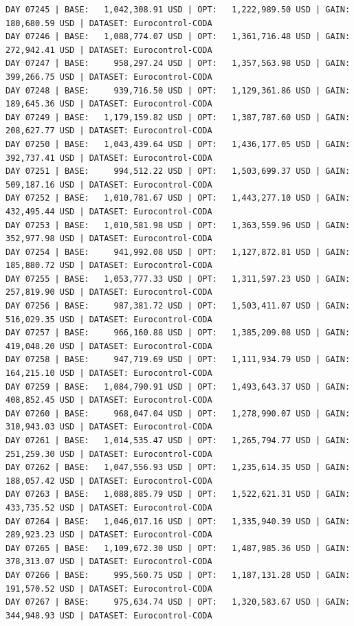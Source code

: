 \documentclass[11pt,a4paper]{article}
\begin{document}
\begin{verbatim}
DAY 07245 | BASE:   1,042,308.91 USD | OPT:   1,222,989.50 USD | GAIN: 180,680.59 USD | DATASET: Eurocontrol-CODA
DAY 07246 | BASE:   1,088,774.07 USD | OPT:   1,361,716.48 USD | GAIN: 272,942.41 USD | DATASET: Eurocontrol-CODA
DAY 07247 | BASE:     958,297.24 USD | OPT:   1,357,563.98 USD | GAIN: 399,266.75 USD | DATASET: Eurocontrol-CODA
DAY 07248 | BASE:     939,716.50 USD | OPT:   1,129,361.86 USD | GAIN: 189,645.36 USD | DATASET: Eurocontrol-CODA
DAY 07249 | BASE:   1,179,159.82 USD | OPT:   1,387,787.60 USD | GAIN: 208,627.77 USD | DATASET: Eurocontrol-CODA
DAY 07250 | BASE:   1,043,439.64 USD | OPT:   1,436,177.05 USD | GAIN: 392,737.41 USD | DATASET: Eurocontrol-CODA
DAY 07251 | BASE:     994,512.22 USD | OPT:   1,503,699.37 USD | GAIN: 509,187.16 USD | DATASET: Eurocontrol-CODA
DAY 07252 | BASE:   1,010,781.67 USD | OPT:   1,443,277.10 USD | GAIN: 432,495.44 USD | DATASET: Eurocontrol-CODA
DAY 07253 | BASE:   1,010,581.98 USD | OPT:   1,363,559.96 USD | GAIN: 352,977.98 USD | DATASET: Eurocontrol-CODA
DAY 07254 | BASE:     941,992.08 USD | OPT:   1,127,872.81 USD | GAIN: 185,880.72 USD | DATASET: Eurocontrol-CODA
DAY 07255 | BASE:   1,053,777.33 USD | OPT:   1,311,597.23 USD | GAIN: 257,819.90 USD | DATASET: Eurocontrol-CODA
DAY 07256 | BASE:     987,381.72 USD | OPT:   1,503,411.07 USD | GAIN: 516,029.35 USD | DATASET: Eurocontrol-CODA
DAY 07257 | BASE:     966,160.88 USD | OPT:   1,385,209.08 USD | GAIN: 419,048.20 USD | DATASET: Eurocontrol-CODA
DAY 07258 | BASE:     947,719.69 USD | OPT:   1,111,934.79 USD | GAIN: 164,215.10 USD | DATASET: Eurocontrol-CODA
DAY 07259 | BASE:   1,084,790.91 USD | OPT:   1,493,643.37 USD | GAIN: 408,852.45 USD | DATASET: Eurocontrol-CODA
DAY 07260 | BASE:     968,047.04 USD | OPT:   1,278,990.07 USD | GAIN: 310,943.03 USD | DATASET: Eurocontrol-CODA
DAY 07261 | BASE:   1,014,535.47 USD | OPT:   1,265,794.77 USD | GAIN: 251,259.30 USD | DATASET: Eurocontrol-CODA
DAY 07262 | BASE:   1,047,556.93 USD | OPT:   1,235,614.35 USD | GAIN: 188,057.42 USD | DATASET: Eurocontrol-CODA
DAY 07263 | BASE:   1,088,885.79 USD | OPT:   1,522,621.31 USD | GAIN: 433,735.52 USD | DATASET: Eurocontrol-CODA
DAY 07264 | BASE:   1,046,017.16 USD | OPT:   1,335,940.39 USD | GAIN: 289,923.23 USD | DATASET: Eurocontrol-CODA
DAY 07265 | BASE:   1,109,672.30 USD | OPT:   1,487,985.36 USD | GAIN: 378,313.07 USD | DATASET: Eurocontrol-CODA
DAY 07266 | BASE:     995,560.75 USD | OPT:   1,187,131.28 USD | GAIN: 191,570.52 USD | DATASET: Eurocontrol-CODA
DAY 07267 | BASE:     975,634.74 USD | OPT:   1,320,583.67 USD | GAIN: 344,948.93 USD | DATASET: Eurocontrol-CODA

\end{verbatim}
\end{document}
